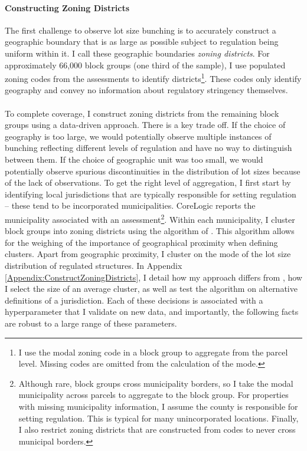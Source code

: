 \documentclass[12pt]{article}
\begin{document}
	 \paragraph*{Constructing Zoning Districts} The first challenge to observe lot size bunching is to accurately construct a geographic boundary that is as large as possible subject to regulation being uniform within it. I call these geographic boundaries \textit{zoning districts}. For approximately 66,000 block groups (one third of the sample), I use populated zoning codes from the assessments to identify districts\footnote{I use the modal zoning code in a block group to aggregate from the parcel level. Missing codes are omitted from the calculation of the mode.}. These codes only identify geography and convey no information about regulatory stringency themselves. 
	 
	 \paragraph*{}
	 To complete coverage, I construct zoning districts from the remaining block groups using a data-driven approach. There is a key trade off. If the choice of geography is too large, we would potentially observe multiple instances of bunching reflecting different levels of regulation and have no way to distinguish between them. If the choice of geographic unit was too small, we would potentially observe spurious discontinuities in the distribution of lot sizes because of the lack of observations. To get the right level of aggregation, I first start by identifying local jurisdictions that are typically responsible for setting regulation -- these tend to be incorporated municipalities. CoreLogic reports the municipality associated with an assessment\footnote{Although rare, block groups cross municipality borders, so I take the modal municipality across parcels to aggregate to the block group. For properties with missing municipality information, I assume the county is responsible for setting regulation. This is typical for many unincorporated locations. Finally, I also restrict zoning districts that are constructed from codes to never cross municipal borders.}. Within each municipality, I cluster block groups into zoning districts using the algorithm of \cite{Chavent2018}. This algorithm allows for the weighing of the importance of geographical proximity when defining clusters. Apart from geographic proximity, I cluster on the mode of the lot size distribution of regulated structures. In Appendix \ref{Appendix:ConstructZoningDistricts}, I detail how my approach differs from \cite{Song}, how I select the size of an average cluster, as well as test the algorithm on alternative definitions of a jurisdiction. Each of these decisions is associated with a hyperparameter that I validate on new data, and importantly, the following facts are robust to a large range of these parameters. 
	 
\end{document}
